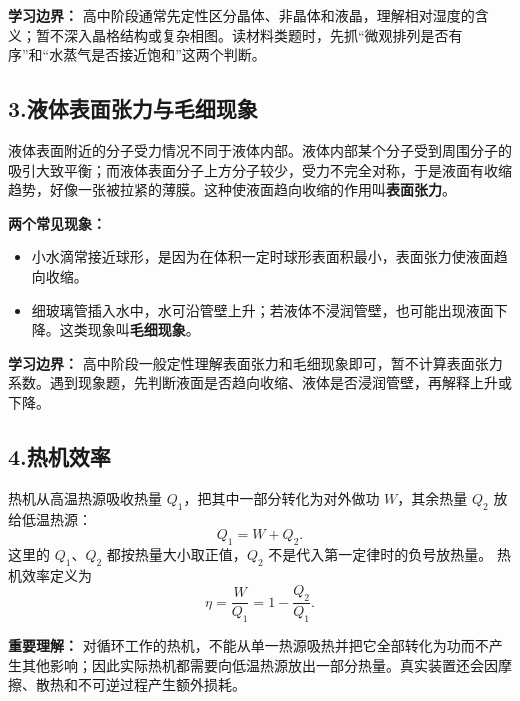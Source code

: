 \textbf{学习边界：} 高中阶段通常先定性区分晶体、非晶体和液晶，理解相对湿度的含义；暂不深入晶格结构或复杂相图。读材料类题时，先抓“微观排列是否有序”和“水蒸气是否接近饱和”这两个判断。

\subsection*{3.\quad 液体表面张力与毛细现象}

液体表面附近的分子受力情况不同于液体内部。液体内部某个分子受到周围分子的吸引大致平衡；而液体表面分子上方分子较少，受力不完全对称，于是液面有收缩趋势，好像一张被拉紧的薄膜。这种使液面趋向收缩的作用叫\textbf{表面张力}。

\begin{center}


\label{fig:surface-tension-capillary}
\end{center}

\textbf{两个常见现象：}
\begin{itemize}
  \item 小水滴常接近球形，是因为在体积一定时球形表面积最小，表面张力使液面趋向收缩。
  \item 细玻璃管插入水中，水可沿管壁上升；若液体不浸润管壁，也可能出现液面下降。这类现象叫\textbf{毛细现象}。
\end{itemize}

\textbf{学习边界：} 高中阶段一般定性理解表面张力和毛细现象即可，暂不计算表面张力系数。遇到现象题，先判断液面是否趋向收缩、液体是否浸润管壁，再解释上升或下降。

\subsection*{4.\quad 热机效率}

热机从高温热源吸收热量 $Q_1$，把其中一部分转化为对外做功 $W$，其余热量 $Q_2$ 放给低温热源：
\[
Q_1=W+Q_2.
\]
这里的 $Q_1$、$Q_2$ 都按热量大小取正值，$Q_2$ 不是代入第一定律时的负号放热量。
热机效率定义为
\[
\eta=\frac{W}{Q_1}=1-\frac{Q_2}{Q_1}.
\]

\begin{center}


\label{fig:heat-engine-cycle}
\end{center}

\textbf{重要理解：} 对循环工作的热机，不能从单一热源吸热并把它全部转化为功而不产生其他影响；因此实际热机都需要向低温热源放出一部分热量。真实装置还会因摩擦、散热和不可逆过程产生额外损耗。

